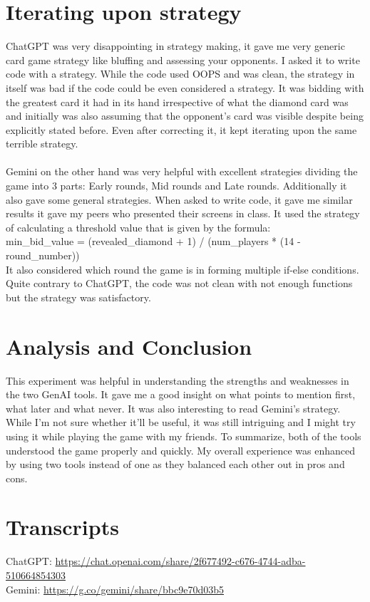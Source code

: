 \documentclass{article}
\begin{document}
\section{Iterating upon strategy}
ChatGPT was very disappointing in strategy making, it gave me very generic card game strategy like bluffing and assessing your opponents. I asked it to write code with a strategy. While the code used OOPS and was clean, the strategy in itself was bad if the code could be even considered a strategy. It was bidding with the greatest card it had in its hand irrespective of what the diamond card was and initially was also assuming that the opponent's card was visible despite being explicitly stated before. Even after correcting it, it kept iterating upon the same terrible strategy. \\
\\
Gemini on the other hand was very helpful with excellent strategies dividing the game into 3 parts: Early rounds, Mid rounds and Late rounds. Additionally it also gave some general strategies. When asked to write code, it gave me similar results it gave my peers who presented their screens in class. It used the strategy of calculating a threshold value that is given by the formula:\\
 min\_bid\_value = (revealed\_diamond + 1) / (num\_players * (14 - round\_number))\\
 It also considered which round the game is in forming multiple if-else conditions. Quite contrary to ChatGPT, the code was not clean with not enough functions but the strategy was satisfactory.

 \section{Analysis and Conclusion}
 This experiment was helpful in understanding the strengths and weaknesses in the two GenAI tools. It gave me a good insight on what points to mention first, what later and what never. It was also interesting to read Gemini's strategy. While I'm not sure whether it'll be useful, it was still intriguing and I might try using it while playing the game with my friends. To summarize, both of the tools understood the game properly and quickly. My overall experience was enhanced by using two tools instead of one as they balanced each other out in pros and cons.

 \section{Transcripts}
 ChatGPT: \url{https://chat.openai.com/share/2f677492-c676-4744-adba-510664854303} \\
 Gemini: \url{https://g.co/gemini/share/bbc9e70d03b5}

 
\end{document}
